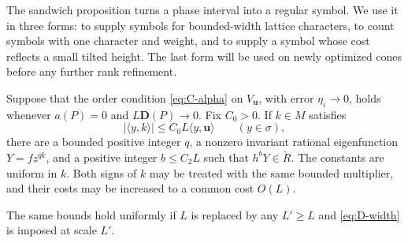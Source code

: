 The sandwich proposition turns a phase interval into a regular symbol.
We use it in three forms: to supply symbols for bounded-width lattice
characters, to count symbols with one character and weight, and to
supply a symbol whose cost reflects a small tilted height.  The last form
will be used on newly optimized cones before any further rank refinement.

\begin{corollary}
\label{cor:D-regularization}
Suppose that the order condition \eqref{eq:C-alpha} on $V_{\mathbf u}$,
with error $\eta_i\to0$, holds whenever $a(P)=0$ and
$L\mathbf D(P)\to0$.  Fix $C_0>0$.  If $k\in M$ satisfies
\begin{equation}\label{eq:D-width}
 |\langle y,k\rangle|\le C_0L\langle y,\mathbf u\rangle
 \qquad(y\in\sigma),
\end{equation}
there are a bounded positive integer $q$, a nonzero invariant rational
eigenfunction $Y=fz^{qk}$, and a positive integer $b\le C_2L$ such that
$h^bY\in\breve R$.  The constants are uniform in $k$.  Both signs of
$k$ may be treated with the same bounded multiplier, and their costs may
be increased to a common cost $O(L)$.

The same bounds hold uniformly if $L$ is replaced by any $L'\ge L$ and
\eqref{eq:D-width} is imposed at scale $L'$.
\end{corollary}

